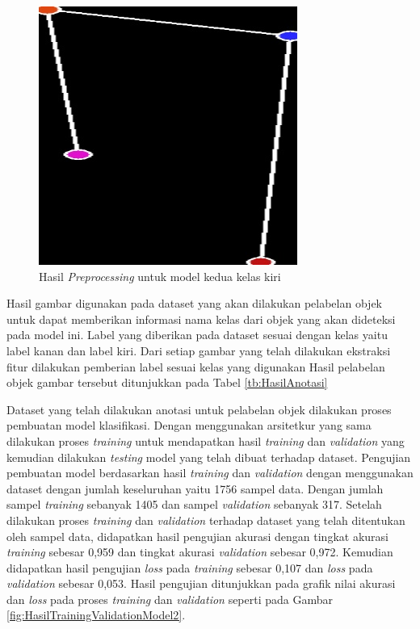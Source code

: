 \begin{figure}[H]
  \centering
  \includegraphics[scale=0.45]{gambar/dataset belakang kiri.jpg}
  \caption{Hasil \emph{Preprocessing} untuk model kedua kelas kiri}
  \label{fig:KelasBelakangKiri}
\end{figure}

Hasil gambar digunakan pada dataset yang akan dilakukan pelabelan objek untuk dapat memberikan informasi nama kelas dari objek yang akan dideteksi pada model ini. Label yang diberikan pada dataset sesuai dengan kelas yaitu label kanan dan label kiri. Dari setiap gambar yang telah dilakukan ekstraksi fitur dilakukan pemberian label sesuai kelas yang digunakan Hasil pelabelan objek gambar tersebut ditunjukkan pada Tabel \ref{tb:HasilAnotasi}

Dataset yang telah dilakukan anotasi untuk pelabelan objek dilakukan proses pembuatan model klasifikasi. Dengan menggunakan arsitetkur yang sama dilakukan proses \emph{training} untuk mendapatkan hasil \emph{training} dan \emph{validation} yang kemudian dilakukan \emph{testing} model yang telah dibuat terhadap dataset. Pengujian pembuatan model berdasarkan hasil \emph{training} dan \emph{validation} dengan menggunakan dataset dengan jumlah keseluruhan yaitu 1756 sampel data. Dengan jumlah sampel \emph{training} sebanyak 1405 dan sampel \emph{validation} sebanyak 317. Setelah dilakukan proses \emph{training} dan \emph{validation} terhadap dataset yang telah ditentukan oleh sampel data, didapatkan hasil pengujian akurasi dengan tingkat akurasi \emph{training} sebesar 0,959 dan tingkat akurasi \emph{validation} sebesar 0,972. Kemudian didapatkan hasil pengujian \emph{loss} pada \emph{training} sebesar 0,107 dan \emph{loss} pada \emph{validation} sebesar 0,053. Hasil pengujian ditunjukkan pada grafik nilai akurasi dan \emph{loss} pada proses \emph{training} dan \emph{validation} seperti pada Gambar \ref{fig:HasilTrainingValidationModel2}.

